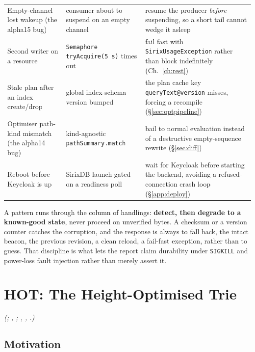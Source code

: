 \documentclass[11pt,a4paper,oneside]{report}
\theoremstyle{sirixthm}
\newcommand{\code}[1]{\texttt{#1}}
\begin{document}
{\begin{xltabular}{\linewidth}{@{}>{\RaggedRight\arraybackslash}p{0.235\textwidth} >{\RaggedRight\arraybackslash}p{0.25\textwidth} >{\RaggedRight\arraybackslash}X@{}}
Empty-channel lost wakeup (the alpha15 bug) & consumer about to suspend on an empty channel & resume the producer \emph{before} suspending, so a short tail cannot wedge it asleep\\
Second writer on a resource & \code{Semaphore} \code{tryAcquire(5\,s)} times out & fail fast with \code{SirixUsageException} rather than block indefinitely (Ch.~\ref{ch:rest})\\
Stale plan after an index create/drop & global index-schema version bumped & the plan cache key \code{queryText@version} misses, forcing a recompile (\S\ref{sec:optpipeline})\\
Optimiser path-kind mismatch (the alpha14 bug) & kind-agnostic \code{pathSummary.match} & bail to normal evaluation instead of a destructive empty-sequence rewrite (\S\ref{sec:diff})\\
Reboot before Keycloak is up & SirixDB launch gated on a readiness poll & wait for Keycloak before starting the backend, avoiding a refused-connection crash loop (\S\ref{app:deploy})\\
\bottomrule
\end{xltabular}}

\noindent A pattern runs through the column of handlings: \textbf{detect, then degrade to a known-good
state}, never proceed on unverified bytes. A checksum or a version counter catches the corruption, and
the response is always to fall back, the intact beacon, the previous revision, a clean reload, a
fail-fast exception, rather than to guess. That discipline is what lets the report claim durability
under \code{SIGKILL} and power-loss fault injection rather than merely assert it.

\chapter{HOT: The Height-Optimised Trie}
\label{ch:hot}

\noindent\textit{(; ,
; ,
, .)}

\section{Motivation}
\end{document}
